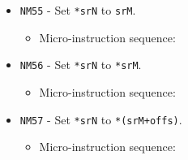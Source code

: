 \documentclass{article}
\def\specialtoaddr#1{\Verb|#1102| - output \Verb|sr#1| to addr bus}
\def\pkptrout{\Verb|0202| - output *\Verb|pk| to data bus}
\def\datatooffs{\Verb|4402| - write to \Verb|offs| from data bus}
\def\incrementpk{\Verb|0502| - increment \Verb|pk|}
\def\writeRAMo{\Verb|0104| - write data bus to *(addr bus+\Verb|offs|)}
\def\echodatalong{\Verb|0025| - echo data bus to itself for 3 cycles}
\def\done{\Verb|fffe| - end instruction}
\begin{document}
\begin{itemize}
    \item \Verb|NM55| - Set \Verb|*srN| to \Verb|srM|.
    \begin{itemize}
        \item Micro-instruction sequence:
    \end{itemize}
    
    \item \Verb|NM56| - Set \Verb|*srN| to \Verb|*srM|.
    \begin{itemize}
        \item Micro-instruction sequence:
    \end{itemize}
    
    \item \Verb|NM57| - Set \Verb|*srN| to \Verb|*(srM+offs)|.
    \begin{itemize}
        \item Micro-instruction sequence:
    \end{itemize}


\end{itemize}
\end{document}
